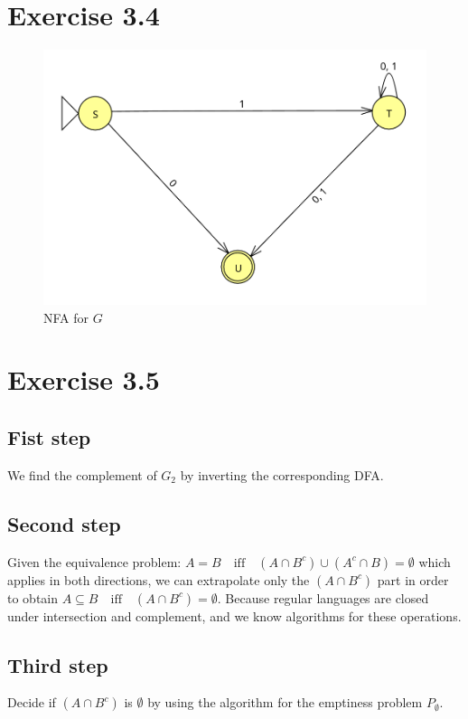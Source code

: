 \documentclass{article} %
\newcommand{\homeworkNumber}{3}
\begin{document}
\clearpage

\section*{Exercise \homeworkNumber.4}
\begin{figure}[h]
		\includegraphics[width=\linewidth]{ex4.png}
		\centering
		\caption{NFA for $G$}
\end{figure}

\section*{Exercise \homeworkNumber.5}
\subsection*{Fist step}
We find the complement of $G_2$ by inverting the corresponding DFA.

\subsection*{Second step}
Given the equivalence problem: $A = B \quad \text{iff} \quad (A \cap B^c) \cup (A^c \cap B) = \emptyset$
which applies in both directions, we can extrapolate only the $(A \cap B^c)$ part in order to obtain $A \subseteq B \quad \text{iff} \quad (A \cap B^c) = \emptyset$. Because regular languages are closed under intersection and complement, and we know algorithms for these operations.

\subsection*{Third step}
Decide if $(A \cap B^c)$ is $\emptyset$ by using the algorithm for the emptiness problem $P_\emptyset$.
\end{document}
